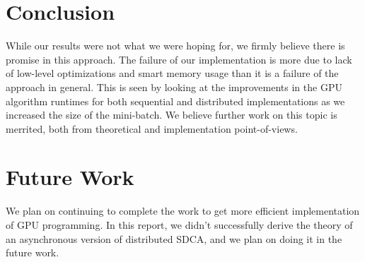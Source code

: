 \documentclass{article}
\begin{document}
\section{Conclusion}
While our results were not what we were hoping for, we firmly believe there is
promise in this approach. The failure of our implementation is more due to lack
of low-level optimizations and smart memory usage than it is a failure of the
approach in general. This is seen by looking at the improvements in the GPU
algorithm runtimes for both sequential and distributed implementations as we
increased the size of the mini-batch. We believe further work on this topic is
merrited, both from theoretical and implementation point-of-views.

%
%
\section{Future Work}
We plan on continuing to complete the work to get more efficient implementation of GPU programming. In this report, we didn't successfully derive the theory of an asynchronous version of distributed SDCA, and we plan on doing it in the future work. 


%

\end{document}

